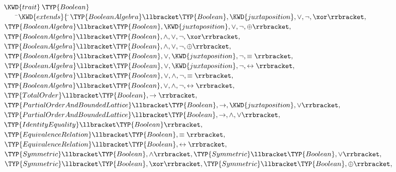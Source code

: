\begin{Fortress}
\(\KWD{trait}\:\TYP{Boolean}\)\\
{\tt~~~~}\pushtabs\=\+\(    \KWD{extends} \{\, \null\)\pushtabs\=\+\(\TYP{BooleanAlgebra}\llbracket\TYP{Boolean},\KWD{juxtaposition},\vee,\neg,\xor\rrbracket,\)\\
\(              \TYP{BooleanAlgebra}\llbracket\TYP{Boolean},\KWD{juxtaposition},\vee,\neg,\oplus\rrbracket,\)\\
\(              \TYP{BooleanAlgebra}\llbracket\TYP{Boolean},\wedge,\vee,\neg,\xor\rrbracket,\)\\
\(              \TYP{BooleanAlgebra}\llbracket\TYP{Boolean},\wedge,\vee,\neg,\oplus\rrbracket,\)\\
\(              \TYP{BooleanAlgebra}\llbracket\TYP{Boolean},\vee,\KWD{juxtaposition},\neg,\equiv\rrbracket,\)\\
\(              \TYP{BooleanAlgebra}\llbracket\TYP{Boolean},\vee,\KWD{juxtaposition},\neg,\leftrightarrow\rrbracket,\)\\
\(              \TYP{BooleanAlgebra}\llbracket\TYP{Boolean},\vee,\wedge,\neg,\equiv\rrbracket,\)\\
\(              \TYP{BooleanAlgebra}\llbracket\TYP{Boolean},\vee,\wedge,\neg,\leftrightarrow\rrbracket,\)\\
\(              \TYP{TotalOrder}\llbracket\TYP{Boolean},\rightarrow\rrbracket,\)\\
\(              \TYP{PartialOrderAndBoundedLattice}\llbracket\TYP{Boolean},\rightarrow,\KWD{juxtaposition},\vee\rrbracket,\)\\
\(              \TYP{PartialOrderAndBoundedLattice}\llbracket\TYP{Boolean},\rightarrow,\wedge,\vee\rrbracket,\)\\
\(              \TYP{IdentityEquality}\llbracket\TYP{Boolean}\rrbracket,\)\\
\(              \TYP{EquivalenceRelation}\llbracket\TYP{Boolean},\equiv\rrbracket,\)\\
\(              \TYP{EquivalenceRelation}\llbracket\TYP{Boolean},\leftrightarrow\rrbracket,\)\\
\(              \TYP{Symmetric}\llbracket\TYP{Boolean},\wedge\rrbracket, \TYP{Symmetric}\llbracket\TYP{Boolean},\vee\rrbracket,\)\\
\(              \TYP{Symmetric}\llbracket\TYP{Boolean},\xor\rrbracket, \TYP{Symmetric}\llbracket\TYP{Boolean},\oplus\rrbracket,\)\\

\end{Fortress}

